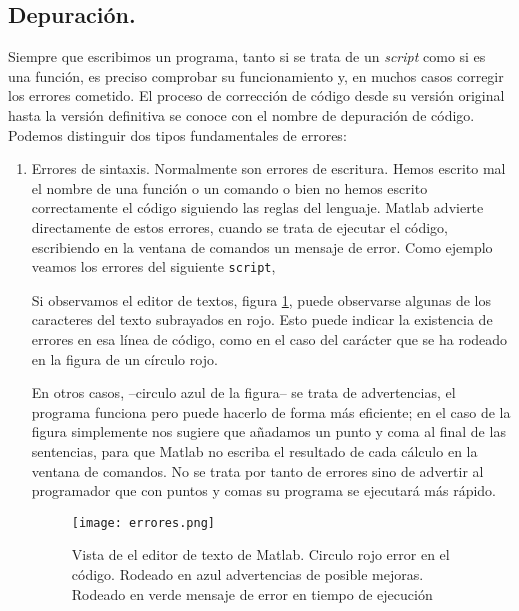 \subsection{Depuración.}
Siempre que escribimos un programa, tanto si se trata de un \emph{script} como si es una función, es preciso comprobar su funcionamiento y, en  muchos casos corregir los errores cometido. El proceso de corrección de código desde su versión original hasta la versión definitiva se conoce con el nombre de depuración de código. Podemos distinguir dos tipos fundamentales de errores:

\begin{enumerate} 
\item Errores de sintaxis. Normalmente son errores de escritura. Hemos escrito mal el nombre de una función o un comando o bien no hemos escrito correctamente el código siguiendo las reglas del lenguaje. Matlab advierte directamente de estos errores, cuando se trata de ejecutar el código, escribiendo en la ventana de comandos un mensaje de error. Como ejemplo veamos los errores del siguiente \texttt{script},



Si observamos el editor de textos, figura \ref{fig:ederror}, puede observarse algunas de los caracteres del texto subrayados en rojo. Esto puede indicar la existencia de errores en esa línea de código, como en el caso del carácter que se ha rodeado en la figura de un círculo rojo. 

En otros casos, --circulo azul de la figura-- se trata de advertencias, el programa funciona pero puede hacerlo de forma más eficiente; en el caso de la figura simplemente nos sugiere que añadamos un punto y coma al final de las sentencias, para que Matlab no escriba el resultado de cada cálculo en la ventana de comandos. No se trata por tanto de errores sino de advertir al programador que con puntos y comas su programa se ejecutará más rápido.

\begin{figure}[h]
\centering
\texttt{[image: errores.png]}
\caption{Vista de el editor de texto de Matlab. Circulo rojo error en el código. Rodeado en azul advertencias de posible mejoras. Rodeado en verde mensaje de error en tiempo de ejecución}
\label{fig:ederror}
\end{figure}


\end{enumerate}
